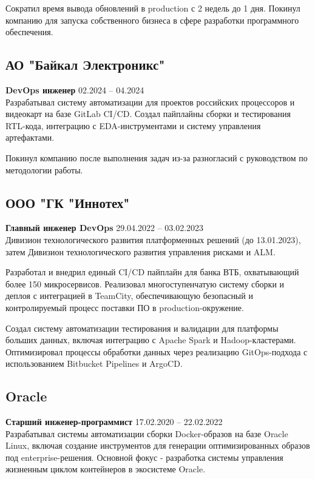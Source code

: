 \documentclass[11pt]{article}
\begin{document}
Сократил время вывода обновлений в production с 2 недель до 1 дня. Покинул компанию для запуска собственного бизнеса в сфере разработки программного обеспечения.

\subsection{АО "Байкал Электроникс"}
\textbf{DevOps инженер} \hfill 02.2024 -- 04.2024 \\

Разрабатывал систему автоматизации для проектов российских процессоров и видеокарт на базе GitLab CI/CD. Создал пайплайны сборки и тестирования RTL-кода, интеграцию с EDA-инструментами и систему управления артефактами.

Покинул компанию после выполнения задач из-за разногласий с руководством по методологии работы.

\subsection{ООО "ГК "Иннотех"}
\textbf{Главный инженер DevOps} \hfill 29.04.2022 -- 03.02.2023 \\
Дивизион технологического развития платформенных решений (до 13.01.2023), затем Дивизион технологического развития управления рисками и ALM.

Разработал и внедрил единый CI/CD пайплайн для банка ВТБ, охватывающий более 150 микросервисов. Реализовал многоступенчатую систему сборки и деплоя с интеграцией в TeamCity, обеспечивающую безопасный и контролируемый процесс поставки ПО в production-окружение.

Создал систему автоматизации тестирования и валидации для платформы больших данных, включая интеграцию с Apache Spark и Hadoop-кластерами. Оптимизировал процессы обработки данных через реализацию GitOps-подхода с использованием Bitbucket Pipelines и ArgoCD.

\subsection{Oracle}
\textbf{Старший инженер-программист} \hfill 17.02.2020 -- 22.02.2022 \\

Разрабатывал системы автоматизации сборки Docker-образов на базе Oracle Linux, включая создание инструментов для генерации оптимизированных образов под enterprise-решения. Основной фокус - разработка системы управления жизненным циклом контейнеров в экосистеме Oracle.
\end{document}
